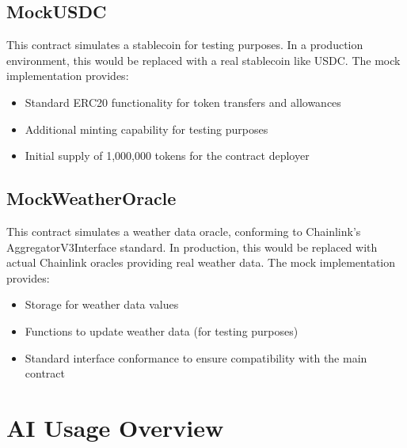 \documentclass[11pt,a4paper]{article}
\begin{document}
		\subsection{MockUSDC}\label{subsec:analysis-mock-usdc}
		This contract simulates a stablecoin for testing purposes.
		In a production environment, this would be replaced with a real stablecoin like USDC. The mock implementation provides:

		\begin{itemize}
			\item Standard ERC20 functionality for token transfers and allowances
			\item Additional minting capability for testing purposes
			\item Initial supply of 1,000,000 tokens for the contract deployer
		\end{itemize}

		\subsection{MockWeatherOracle}\label{subsec:analysis-mock-weather-oracle}
		This contract simulates a weather data oracle, conforming to Chainlink's AggregatorV3Interface standard.
		In production, this would be replaced with actual Chainlink oracles providing real weather data.
		The mock implementation provides:

		\begin{itemize}
			\item Storage for weather data values
			\item Functions to update weather data (for testing purposes)
			\item Standard interface conformance to ensure compatibility with the main contract
		\end{itemize}

        \pagebreak

        \section{AI Usage Overview}\label{sec:AI-Usage}
\end{document}
